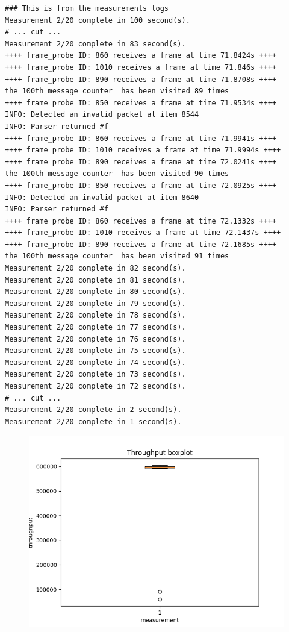 \documentclass{article}
\begin{document}
\begin{verbatim}
### This is from the measurements logs
Measurement 2/20 complete in 100 second(s).
# ... cut ...
Measurement 2/20 complete in 83 second(s).
++++ frame_probe ID: 860 receives a frame at time 71.8424s ++++
++++ frame_probe ID: 1010 receives a frame at time 71.846s ++++
++++ frame_probe ID: 890 receives a frame at time 71.8708s ++++
the 100th message counter  has been visited 89 times  
++++ frame_probe ID: 850 receives a frame at time 71.9534s ++++
INFO: Detected an invalid packet at item 8544
INFO: Parser returned #f
++++ frame_probe ID: 860 receives a frame at time 71.9941s ++++
++++ frame_probe ID: 1010 receives a frame at time 71.9994s ++++
++++ frame_probe ID: 890 receives a frame at time 72.0241s ++++
the 100th message counter  has been visited 90 times  
++++ frame_probe ID: 850 receives a frame at time 72.0925s ++++
INFO: Detected an invalid packet at item 8640
INFO: Parser returned #f
++++ frame_probe ID: 860 receives a frame at time 72.1332s ++++
++++ frame_probe ID: 1010 receives a frame at time 72.1437s ++++
++++ frame_probe ID: 890 receives a frame at time 72.1685s ++++
the 100th message counter  has been visited 91 times  
Measurement 2/20 complete in 82 second(s).
Measurement 2/20 complete in 81 second(s).
Measurement 2/20 complete in 80 second(s).
Measurement 2/20 complete in 79 second(s).
Measurement 2/20 complete in 78 second(s).
Measurement 2/20 complete in 77 second(s).
Measurement 2/20 complete in 76 second(s).
Measurement 2/20 complete in 75 second(s).
Measurement 2/20 complete in 74 second(s).
Measurement 2/20 complete in 73 second(s).
Measurement 2/20 complete in 72 second(s).
# ... cut ...
Measurement 2/20 complete in 2 second(s).
Measurement 2/20 complete in 1 second(s).
\end{verbatim}

\begin{figure}[h] \label{usrp-fails-5}
	\includegraphics[width=\textwidth]{usrp_fail_tp_boxplot}
	
\end{figure}
\end{document}
